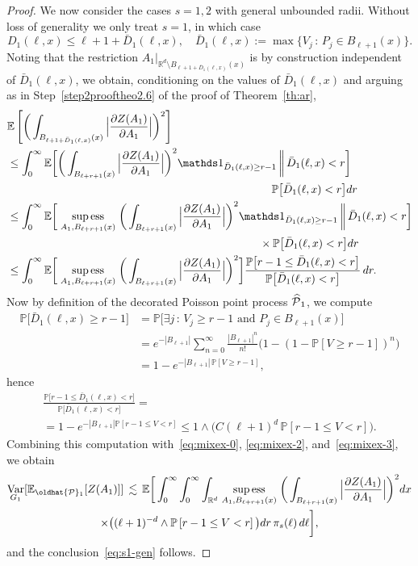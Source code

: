 \documentclass[AHL,Unicode,longabstracts]{cedram}
\newcommand{\R}{\mathbb R}
\newcommand{\E}{\mathbb{E}}
\newcommand{\expecM}[1]{\mathbb{E}\bigg[#1 \bigg]}
\newcommand{\expec}[1]{\mathbb{E}\left[#1 \right]}
\newcommand{\pr}[1]{\mathbb{P}\left[#1 \right]}
\newcommand{\prm}[1]{\mathbb{P}\big[#1 \big]}
\newcommand{\expeCM}[2]{\mathbb{E}\bigg[#1 \,\bigg\|\,#2\bigg]}
\newcommand{\Pc}{\mathcal P}
\DeclareMathOperator{\Var}{Var}
\DeclareMathOperator{\supess}{sup\,ess}
\newcommand{\supessd}[1]{\mathrel{\mathop{\supess}\limits_{#1}}}
\renewcommand*{\hat}[1]{\mathchoice{\widehat{#1}}{\widehat{#1}}{\oldhat{#1}}{\oldhat{#1}}}\let\oldexists\exists
\renewcommand*{\exists}{\mathrel{\oldexists}}
\begin{document}
\begin{proof}
\noindent We now consider the cases $s=1,2$ with general unbounded radii. Without loss of generality we only treat $s=1$, in which case
\[
D_1(\ell,x)\le\ell+1+\bar D_1(\ell,x),\quad \bar D_1(\ell,x):=\max\big\{V_j\,:\,P_j\in B_{\ell+1}(x)\big\}.
\]
Noting that the restriction $A_1|_{\R^d\setminus B_{\ell+1+\bar D_1(\ell,x)}(x)}$ is by construction independent of $\bar D_1(\ell,x)$, we obtain, conditioning on the values of $\bar D_1(\ell,x)$ and arguing as in Step~\ref{step2prooftheo2.6} of the proof of Theorem~\ref{th:ar},
\begin{equation}\label{eq:mixex-3}
\begin{aligned}
&\lefteqn{\expec{\bigg(\int_{B_{\ell+1+\bar D_1(\ell,x)}(x)}\Big|\frac{\partial Z(A_1)}{\partial A_1}\Big|\bigg)^2}}\\
&\le \int_0^\infty \expeCM{\bigg(\int_{B_{\ell+r+1}(x)}\Big|\frac{\partial Z(A_1)}{\partial A_1}\Big|\bigg)^2\mathds1_{\bar D_1(\ell,x)\ge r-1}}{\bar D_1(\ell,x)<r}\\
&\mkern430mu \prm{\bar D_1(\ell,x)<r}dr\\
&\le \int_0^\infty \expeCM{\supessd{A_1,B_{\ell+r+1}(x)}\bigg(\int_{B_{\ell+r+1}(x)}\Big|\frac{\partial Z(A_1)}{\partial A_1}\Big|\bigg)^2\mathds1_{\bar D_1(\ell,x)\ge r-1}}{\bar D_1(\ell,x)<r}\\
&\mkern410mu\times\prm{\bar D_1(\ell,x)<r}dr\\
&\le\int_0^\infty\expecM{\supessd{A_1,B_{\ell+r+1}(x)}\bigg(\int_{B_{\ell+r+1}(x)}\Big|\frac{\partial Z(A_1)}{\partial A_1}\Big|\bigg)^2}\frac{\prm{r-1\le\bar D_1(\ell,x)<r}}{\prm{\bar D_1(\ell,x)<r}}\,dr.
\end{aligned}
\end{equation}
Now by definition of the decorated Poisson point process $\hat\Pc_1$, we compute
\begin{align*}
\prm{\bar D_1(\ell,x)\ge r-1}&=\prm{\exists j \,:\, V_j\ge r-1\text{ and }P_j\in B_{\ell+1}(x)}\\
&=e^{-|B_{\ell+1}|}\sum_{n=0}^\infty \frac{|B_{\ell+1}|^n}{n!}\big(1-(1-\pr{V\ge r-1})^n\big)\\
&=1-e^{-|B_{\ell+1}|\,\pr{V\ge r-1}},
\end{align*}
hence
\begin{multline*}
\frac{\prm{r-1\le\bar D_1(\ell,x)<r}}{\prm{\bar D_1(\ell,x)<r}}=\\
=1-e^{-|B_{\ell+1}|\pr{r-1\le V<r}}\le 1\wedge\big(C(\ell+1)^d\,\pr{r-1\le V<r}\big).
\end{multline*}
Combining this computation with~\eqref{eq:mixex-0}, \eqref{eq:mixex-2}, and~\eqref{eq:mixex-3}, we obtain
\begin{multline*}
\Var_{G_1}[\E_{\hat\Pc_1}[Z(A_1)]]
\,\lesssim\, \E\bigg[\int_0^\infty\int_0^\infty\int_{\R^d}\supessd{A_1,B_{\ell+r+1}(x)}\bigg(\int_{B_{\ell+r+1}(x)}\Big|\frac{\partial Z(A_1)}{\partial A_1}\Big|\bigg)^2dx\\
\times\big((\ell+1)^{-d}\wedge\pr{r-1\le V<r}\big)dr\,\pi_s(\ell)\,d\ell\bigg],
\end{multline*}
and the conclusion~\eqref{eq:s1-gen} follows.


\end{proof}
\end{document}
